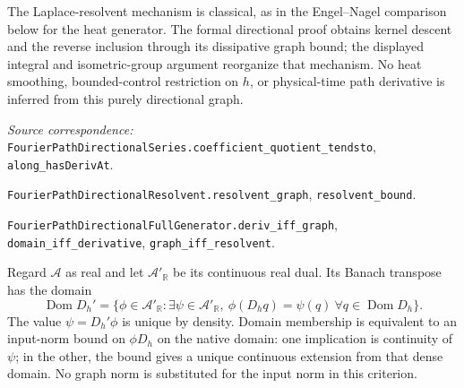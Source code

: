 \documentclass[11pt]{article}
\theoremstyle{remark}\newtheorem{remark}[theorem]{Remark}
\newcommand{\R}{\mathbb R}\newcommand{\C}{\mathbb C}
\newcommand{\A}{\mathcal A}\newcommand{\X}{\mathcal X}
\newcommand{\code}[1]{{\small\nolinkurl{#1}}}
\begin{document}
The Laplace-resolvent mechanism is classical, as in the
Engel--Nagel comparison below for the heat generator. The formal
directional proof obtains kernel descent and the reverse inclusion
through its dissipative graph bound; the displayed integral and
isometric-group argument reorganize that mechanism. No heat
smoothing, bounded-control restriction on $h$, or physical-time
path derivative is inferred from this purely directional graph.

\par\noindent\begingroup\small\raggedright
\textit{Source correspondence:}
\code{FourierPathDirectionalSeries.coefficient_quotient_tendsto},
\code{along_hasDerivAt}.
\par\noindent
\code{FourierPathDirectionalResolvent.resolvent_graph},
\code{resolvent_bound}.
\par\noindent
\code{FourierPathDirectionalFullGenerator.deriv_iff_graph},
\code{domain_iff_derivative}, \code{graph_iff_resolvent}.
\par\endgroup

Regard $\A$ as real and let $\A'_{\R}$ be its continuous real dual.
Its Banach transpose has the domain
\[
 \operatorname{Dom}D_h'=\{\phi\in\A'_{\R}:\exists\psi\in\A'_{\R},\
       \phi(D_hq)=\psi(q)\ \forall q\in\operatorname{Dom}D_h\}.
\]
The value $\psi=D_h'\phi$ is unique by density. Domain membership is
equivalent to an input-norm bound on $\phi D_h$ on the native domain:
one implication is continuity of $\psi$; in the other, the bound gives
a unique continuous extension from that dense domain. No graph norm
is substituted for the input norm in this criterion.
\end{document}
